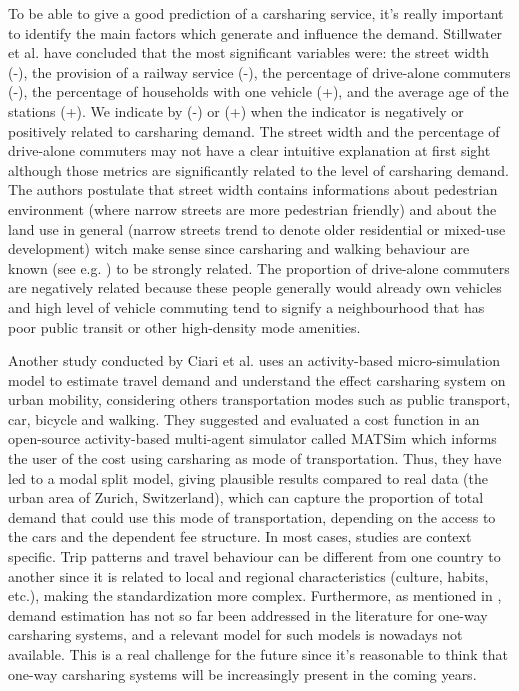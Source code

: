 \begin{bibunit}[ieeetr]
To be able to give a good prediction of a carsharing service, it's really important to identify the main factors which generate and influence the demand.
Stillwater et al. \cite{stillwater_carsharing_2009} have concluded that the most significant variables were: the street width (-), the provision of a railway service (-), the percentage of drive-alone commuters (-), the percentage of households with one vehicle (+), and the average age of the stations (+).
We indicate by (-) or (+) when the indicator is negatively or positively related to carsharing demand.
The street width and the percentage of drive-alone commuters may not have a clear intuitive explanation at first sight although those metrics are significantly related to the level of carsharing demand.
The authors postulate that street width contains informations about pedestrian environment (where narrow streets are more pedestrian friendly) and about the land use in general (narrow streets trend to denote older residential or mixed-use development) witch make sense since carsharing and walking behaviour are known (see e.g. \cite{cervero_city_2003}) to be strongly related.
The proportion of drive-alone commuters are negatively related because these people generally would already own vehicles and high level of vehicle commuting tend to signify a neighbourhood that has poor public transit or other high-density mode amenities.

Another study conducted by Ciari et al. \cite{ciari_estimation_2013} uses an activity-based micro-simulation model to estimate travel demand and understand the effect carsharing system on urban mobility, considering others transportation modes such as public transport, car, bicycle and walking.
They suggested and evaluated a cost function in an open-source activity-based multi-agent simulator called MATSim \cite{matsim_webPage} which informs the user of the cost using carsharing as mode of transportation.
Thus, they have led to a modal split model, giving plausible results compared to real data (the urban area of Zurich, Switzerland), which can capture the proportion of total demand that could use this mode of transportation, depending on the access to the cars and the dependent fee structure.
In most cases, studies are context specific.
Trip patterns and travel behaviour can be different from one country to another since it is related to local and regional characteristics (culture, habits, etc.), making the standardization more complex.
Furthermore, as mentioned in \cite{jorge_carsharing_2013}, demand estimation has not so far been addressed in the literature for one-way carsharing systems, and a relevant model for such models is nowadays not available.
This is a real challenge for the future since it's reasonable to think that one-way carsharing systems will be increasingly present in the coming years.


\end{bibunit}
